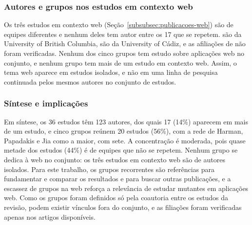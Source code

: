 \subsubsection{Autores e grupos nos estudos em contexto web}
\label{subsubsec:autores-web}

Os três estudos em contexto web (Seção~\ref{subsubsec:publicacoes-web}) são de equipes diferentes e nenhum deles tem autor entre os 17 que se repetem.  são da University of British Columbia,  são da University of Cádiz, e as afiliações de  não foram verificadas. Nenhum dos cinco grupos tem estudo sobre aplicações web no conjunto, e nenhum grupo tem mais de um estudo em contexto web. Assim, o tema web aparece em estudos isolados, e não em uma linha de pesquisa continuada pelos mesmos autores no conjunto de estudos.

\subsubsection{Síntese e implicações}
\label{subsubsec:sintese-autores}

Em síntese, os 36 estudos têm 123 autores, dos quais 17 (14\%) aparecem em mais de um estudo, e cinco grupos reúnem 20 estudos (56\%), com a rede de Harman, Papadakis e Jia como a maior, com sete. A concentração é moderada, pois quase metade dos estudos (44\%) é de equipes que não se repetem. Nenhum grupo se dedica à web no conjunto: os três estudos em contexto web são de autores isolados. Para este trabalho, os grupos recorrentes são referências para fundamentar e comparar os resultados e para buscar outras publicações, e a escassez de grupos na web reforça a relevância de estudar mutantes em aplicações web. Como os grupos foram definidos só pela coautoria entre os estudos da revisão, podem existir vínculos fora do conjunto, e as filiações foram verificadas apenas nos artigos disponíveis.